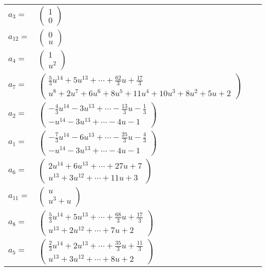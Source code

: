 \documentclass[1p]{elsarticle_modified}
\theoremstyle{definition}
\begin{document}
\begin{tabular}{m{7pt} m{180pt} m{7pt} m{180pt} }
\flushright $a_{3}=$&$\begin{pmatrix}1\\0\end{pmatrix}$ \\
\flushright $a_{12}=$&$\begin{pmatrix}0\\u\end{pmatrix}$ \\
\flushright $a_{4}=$&$\begin{pmatrix}1\\u^2\end{pmatrix}$ \\
\flushright $a_{7}=$&$\begin{pmatrix}\frac{5}{3} u^{14}+5 u^{13}+\cdots+\frac{62}{3} u+\frac{17}{3}\\u^8+2 u^7+6 u^6+8 u^5+11 u^4+10 u^3+8 u^2+5 u+2\end{pmatrix}$ \\
\flushright $a_{2}=$&$\begin{pmatrix}-\frac{4}{3} u^{14}-3 u^{13}+\cdots-\frac{13}{3} u-\frac{1}{3}\\- u^{14}-3 u^{13}+\cdots-4 u-1\end{pmatrix}$ \\
\flushright $a_{1}=$&$\begin{pmatrix}-\frac{7}{3} u^{14}-6 u^{13}+\cdots-\frac{25}{3} u-\frac{4}{3}\\- u^{14}-3 u^{13}+\cdots-4 u-1\end{pmatrix}$ \\
\flushright $a_{6}=$&$\begin{pmatrix}2 u^{14}+6 u^{13}+\cdots+27 u+7\\u^{13}+3 u^{12}+\cdots+11 u+3\end{pmatrix}$ \\
\flushright $a_{11}=$&$\begin{pmatrix}u\\u^3+u\end{pmatrix}$ \\
\flushright $a_{8}=$&$\begin{pmatrix}\frac{5}{3} u^{14}+5 u^{13}+\cdots+\frac{68}{3} u+\frac{17}{3}\\u^{13}+2 u^{12}+\cdots+7 u+2\end{pmatrix}$ \\
\flushright $a_{5}=$&$\begin{pmatrix}\frac{2}{3} u^{14}+2 u^{13}+\cdots+\frac{35}{3} u+\frac{11}{3}\\u^{13}+3 u^{12}+\cdots+8 u+2\end{pmatrix}$ \\

\end{tabular}
\end{document}
